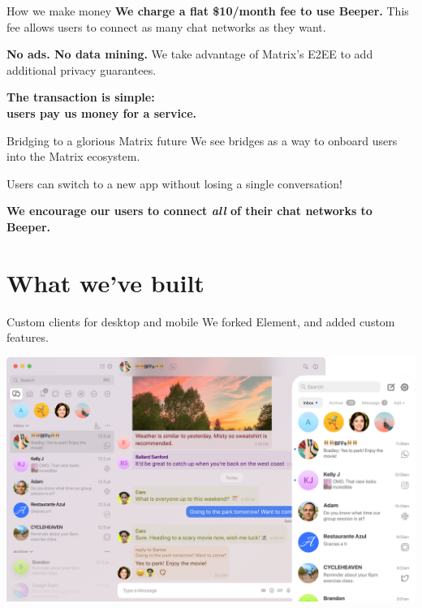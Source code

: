 \documentclass{beeper}
\begin{document}
\begin{frame}{How we make money}
    \textbf{We charge a flat \$10/month fee to use Beeper.} This fee allows
    users to connect as many chat networks as they want.
    \pause

    \textbf{No ads. No data mining.} We take advantage of Matrix's E2EE to add
    additional privacy guarantees.
    \pause

    \begin{center}
        \LARGE
        \textbf{The transaction is simple:\\ users pay us money for a service.}
    \end{center}
\end{frame}

\begin{frame}{Bridging to a glorious Matrix future}
    We see bridges as a way to onboard users into the Matrix ecosystem.

    Users can switch to a new app without losing a single conversation!
    \pause

    \vspace{1cm}
    \begin{center}
        \Large
        \textbf{We encourage our users to connect \textit{all} of their chat
        networks to Beeper.}
    \end{center}
\end{frame}

\section{What we've built}

\begin{frame}{Custom clients for desktop and mobile}
    We forked Element, and added custom features.
    \vspace{0.5cm}

    \centerline{\includegraphics[width=\textwidth]{images/desktop-and-mobile}}
\end{frame}
\end{document}
